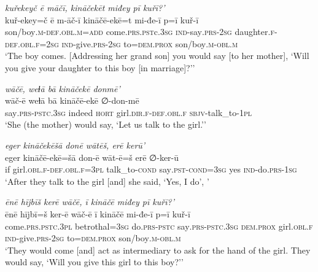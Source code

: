 \ea \label{ŽE.75}
\textit{kuřekeyč ē māčī, kināčekēt miđey pī kuřī?’} \\ 
\gll kuř-ekey=č ē m-āč-ī kināčē-ekē=t mi-đe-ī p=ī kuř-ī \\ 
 son/boy\textsc{.m}\textsc{-def}\textsc{.obl}\textsc{.m}\textsc{=add} come\textsc{.prs}\textsc{.pst}c\textsc{.3sg} \textsc{ind-}say\textsc{.prs}-\textsc{2sg} daughter\textsc{.f}\textsc{-def}\textsc{.obl}\textsc{.f}\textsc{=\textsc{2sg}} \textsc{ind-}give\textsc{.prs}-\textsc{2sg} to=\textsc{dem.prox} son/boy\textsc{.m}\textsc{-obl}\textsc{.m} \\ 
\glt `The boy comes. [Addressing her grand son] you would say [to her mother], ‘Will you give your daughter to this boy [in marriage]?’'
\z 
 
\ea \label{ŽE.76}
\textit{wāčē, weɫā bā kināčekē donmē’} \\ 
\gll wāč-ē weɫā bā kināčē-ekē ∅-don-mē \\ 
 say\textsc{.prs-pstc}\textsc{.3sg} indeed \textsc{hort} girl\textsc{.dir}\textsc{.f}\textsc{-def}\textsc{.obl}\textsc{.f} \textsc{sbjv-}talk\_to\textsc{-1pl} \\ 
\glt `She (the mother) would say, ‘Let us talk to the girl.’'
\z 
 
\ea \label{ŽE.77}
\textit{eger kināčekēšā donē wātēš, erē kerū’} \\ 
\gll eger kināčē-ekē=šā don-ē wāt-ē=š erē ∅-ker-ū \\ 
 if girl\textsc{.obl}\textsc{.f}\textsc{-def}\textsc{.obl}\textsc{.f}\textsc{=3pl} talk\_to\textsc{-cond} say\textsc{.pst}\textsc{-cond}\textsc{=3sg} yes \textsc{ind-}do\textsc{.prs}\textsc{-\textsc{1sg}} \\ 
\glt `After they talk to the girl [and] she said, ‘Yes, I do’, '
\z 
 
\ea \label{ŽE.80}
\textit{ēnē hījbīš kerē wāčē, ī kināčē miđey pī kuřī?’} \\ 
\gll ēnē hījbī=š ker-ē wāč-ē ī kināčē mi-đe-ī p=ī kuř-ī \\ 
 come\textsc{.prs}\textsc{.pstc}\textsc{.3pl} betrothal\textsc{=3sg} do\textsc{.prs}\textsc{-pstc} say\textsc{.prs-pstc}\textsc{.3sg} \textsc{dem.prox} girl\textsc{.obl}\textsc{.f} \textsc{ind-}give\textsc{.prs}-\textsc{2sg} to=\textsc{dem.prox} son/boy\textsc{.m}\textsc{-obl}\textsc{.m} \\ 
\glt `They would come [and] act as intermediary to ask for the hand of the girl. They would say, ‘Will you give this girl to this boy?’'
\z 
 
